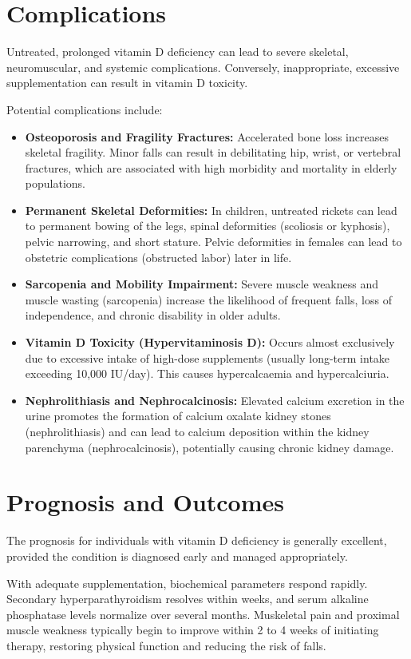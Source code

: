 \section*{Complications}
Untreated, prolonged vitamin D deficiency can lead to severe skeletal, neuromuscular, and systemic complications. Conversely, inappropriate, excessive supplementation can result in vitamin D toxicity.

Potential complications include:
\begin{itemize}
    \item \textbf{Osteoporosis and Fragility Fractures:} Accelerated bone loss increases skeletal fragility. Minor falls can result in debilitating hip, wrist, or vertebral fractures, which are associated with high morbidity and mortality in elderly populations.
    \item \textbf{Permanent Skeletal Deformities:} In children, untreated rickets can lead to permanent bowing of the legs, spinal deformities (scoliosis or kyphosis), pelvic narrowing, and short stature. Pelvic deformities in females can lead to obstetric complications (obstructed labor) later in life.
    \item \textbf{Sarcopenia and Mobility Impairment:} Severe muscle weakness and muscle wasting (sarcopenia) increase the likelihood of frequent falls, loss of independence, and chronic disability in older adults.
    \item \textbf{Vitamin D Toxicity (Hypervitaminosis D):} Occurs almost exclusively due to excessive intake of high-dose supplements (usually long-term intake exceeding 10,000 IU/day). This causes hypercalcaemia and hypercalciuria.
    \item \textbf{Nephrolithiasis and Nephrocalcinosis:} Elevated calcium excretion in the urine promotes the formation of calcium oxalate kidney stones (nephrolithiasis) and can lead to calcium deposition within the kidney parenchyma (nephrocalcinosis), potentially causing chronic kidney damage.
\end{itemize}

\section*{Prognosis and Outcomes}
The prognosis for individuals with vitamin D deficiency is generally excellent, provided the condition is diagnosed early and managed appropriately.

With adequate supplementation, biochemical parameters respond rapidly. Secondary hyperparathyroidism resolves within weeks, and serum alkaline phosphatase levels normalize over several months. Muskeletal pain and proximal muscle weakness typically begin to improve within 2 to 4 weeks of initiating therapy, restoring physical function and reducing the risk of falls.


